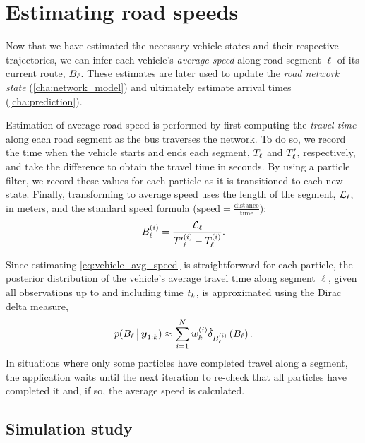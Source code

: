 \section{Estimating road speeds}
\label{sec:vehicle_speeds}

Now that we have estimated the necessary vehicle states and their respective trajectories, we can infer each vehicle's \emph{average speed} along road segment $\ell$ of its current route, $B_{\ell}$. These estimates are later used to update the \emph{road network state} (\cref{cha:network_model}) and ultimately estimate arrival times (\cref{cha:prediction}).


Estimation of average road speed is performed by first computing the \emph{travel time} along each road segment as the bus traverses the network. To do so, we record the time when the vehicle starts and ends each segment, $T_\ell$ and $T'_\ell$, respectively, and take the difference to obtain the travel time in seconds. By using a particle filter, we record these values for each particle as it is transitioned to each new state. Finally, transforming to average speed uses the length of the segment, $\mathcal{L}_\ell$, in meters, and the standard speed formula ($\text{speed} = \frac{\text{distance}}{\text{time}}$):
\begin{equation}
\label{eq:vehicle_avg_speed}
B^{(i)}_\ell = \frac{\mathcal{L}_\ell}{{T'}^{(i)}_\ell - {T}^{(i)}_\ell}.
\end{equation}


Since estimating \cref{eq:vehicle_avg_speed} is straightforward for each particle, the posterior distribution of the vehicle's average travel time along segment $\ell$, given all observations up to and including time $t_k$, is approximated using the Dirac delta measure,
\begin{equation}
\label{eq:pf_speed_dist}
p(B_\ell \,\big|\,{} \boldsymbol{y}_{1:k}) \approx
\sum_{i=1}^N w^{(i)}_k \dot\delta_{B^{(i)}_\ell}\left(B_\ell\right).
\end{equation}
In situations where only some particles have completed travel along a segment, the application waits until the next iteration to re-check that all particles have completed it and, if so, the average speed is calculated.


\subsection{Simulation study}
\label{eq:pf_simulation_study}

